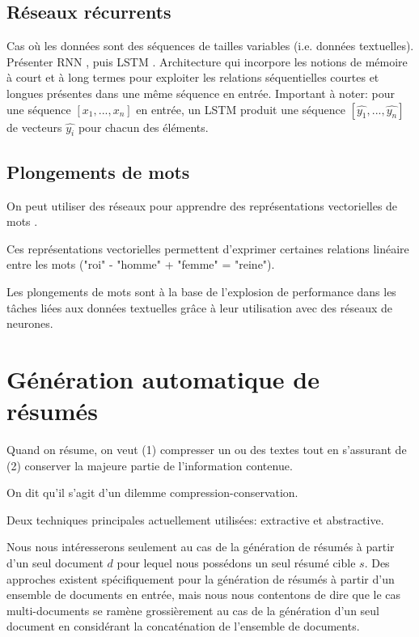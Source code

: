 \subsection{Réseaux récurrents}

Cas où les données sont des séquences de tailles variables (i.e. données
textuelles).
Présenter RNN \citep{schuster1997bidirectional}, puis LSTM \citep{iet:/content/conferences/10.1049/cp_19991218}.
Architecture qui incorpore les notions de mémoire à court et à long termes pour
exploiter les relations séquentielles courtes et longues présentes dans une même
séquence en entrée.
Important à noter: pour une séquence $[x_1, ..., x_n]$ en entrée, un LSTM produit une
séquence $[\hat{y_1}, ..., \hat{y_n}]$ de vecteurs $\hat{y_i}$ pour chacun des éléments.

\subsection{Plongements de mots}
On peut utiliser des réseaux pour apprendre des représentations
vectorielles de mots \citep{NIPS2013_9aa42b31,pennington2014glove}.

Ces représentations vectorielles permettent d'exprimer certaines
relations linéaire entre les mots ("roi" - "homme" + "femme" = "reine").

Les plongements de mots sont à la base de l'explosion de performance dans les
tâches liées aux données textuelles grâce à leur utilisation avec des réseaux de
neurones.

\section{Génération automatique de résumés}

Quand on résume, on veut (1) compresser un ou des textes tout en
s'assurant de (2) conserver la majeure partie de l'information contenue.

On dit qu'il s'agit d'un dilemme compression-conservation.

Deux techniques principales actuellement utilisées: extractive et abstractive.

Nous nous intéresserons seulement au cas de la génération de résumés à partir
d'un seul document $d$ pour lequel nous possédons un seul résumé cible $s$.
Des approches existent spécifiquement pour la génération de résumés
à partir d'un ensemble de documents en entrée, mais nous nous contentons
de dire que le cas multi-documents se ramène grossièrement au cas de la génération d'un seul
document en considérant la concaténation de l'ensemble de documents.

